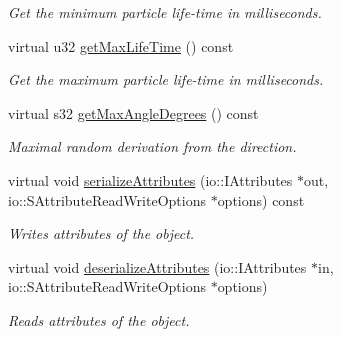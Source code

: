 \begin{DoxyCompactItemize}
\begin{DoxyCompactList}\small\item\em Get the minimum particle life-\/time in milliseconds. \end{DoxyCompactList}\item 
\hypertarget{classirr_1_1scene_1_1_c_particle_cylinder_emitter_acfd16ca82ec775bfb931574c4b0b1a92}{virtual u32 \hyperlink{classirr_1_1scene_1_1_c_particle_cylinder_emitter_acfd16ca82ec775bfb931574c4b0b1a92}{get\-Max\-Life\-Time} () const }\label{classirr_1_1scene_1_1_c_particle_cylinder_emitter_acfd16ca82ec775bfb931574c4b0b1a92}

\begin{DoxyCompactList}\small\item\em Get the maximum particle life-\/time in milliseconds. \end{DoxyCompactList}\item 
\hypertarget{classirr_1_1scene_1_1_c_particle_cylinder_emitter_acafcdbe611a4ddbffa9f46f99aa97537}{virtual s32 \hyperlink{classirr_1_1scene_1_1_c_particle_cylinder_emitter_acafcdbe611a4ddbffa9f46f99aa97537}{get\-Max\-Angle\-Degrees} () const }\label{classirr_1_1scene_1_1_c_particle_cylinder_emitter_acafcdbe611a4ddbffa9f46f99aa97537}

\begin{DoxyCompactList}\small\item\em Maximal random derivation from the direction. \end{DoxyCompactList}\item 
\hypertarget{classirr_1_1scene_1_1_c_particle_cylinder_emitter_a039b4c7b13b8012fb63d7bec571a59fa}{virtual void \hyperlink{classirr_1_1scene_1_1_c_particle_cylinder_emitter_a039b4c7b13b8012fb63d7bec571a59fa}{serialize\-Attributes} (io\-::\-I\-Attributes $\ast$out, io\-::\-S\-Attribute\-Read\-Write\-Options $\ast$options) const }\label{classirr_1_1scene_1_1_c_particle_cylinder_emitter_a039b4c7b13b8012fb63d7bec571a59fa}

\begin{DoxyCompactList}\small\item\em Writes attributes of the object. \end{DoxyCompactList}\item 
\hypertarget{classirr_1_1scene_1_1_c_particle_cylinder_emitter_a2914d5e858528dec815ac4f7178c6d97}{virtual void \hyperlink{classirr_1_1scene_1_1_c_particle_cylinder_emitter_a2914d5e858528dec815ac4f7178c6d97}{deserialize\-Attributes} (io\-::\-I\-Attributes $\ast$in, io\-::\-S\-Attribute\-Read\-Write\-Options $\ast$options)}\label{classirr_1_1scene_1_1_c_particle_cylinder_emitter_a2914d5e858528dec815ac4f7178c6d97}

\begin{DoxyCompactList}\small\item\em Reads attributes of the object. \end{DoxyCompactList}\end{DoxyCompactItemize}


